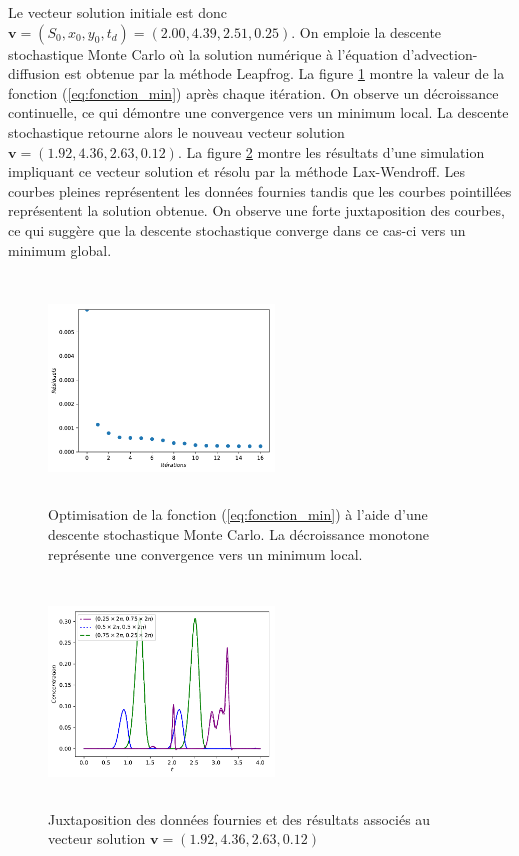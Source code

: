 \documentclass{article}
\begin{document}
Le vecteur solution initiale est donc $\textbf{v} = (S_0, x_0, y_0, t_d) = (2.00, 4.39, 2.51, 0.25)$. On emploie la descente stochastique Monte Carlo où la solution numérique à l'équation d'advection-diffusion est obtenue par la méthode Leapfrog. La figure \ref{fig:LFresiduals} montre la valeur de la fonction (\ref{eq:fonction_min}) après chaque itération. On observe un décroissance continuelle, ce qui démontre une convergence vers un minimum local. La descente stochastique retourne alors le nouveau vecteur solution $\textbf{v} = (1.92, 4.36, 2.63, 0.12)$. La figure \ref{fig:guessGraph} montre les résultats d'une simulation impliquant ce vecteur solution et résolu par la méthode Lax-Wendroff. Les courbes pleines représentent les données fournies tandis que les courbes pointillées représentent la solution obtenue. On observe une forte juxtaposition des courbes, ce qui suggère que la descente stochastique converge dans ce cas-ci vers un minimum global.

\begin{figure}[H]
	\includegraphics[width=6cm, height=6cm]{img/LFresiduels.pdf}
	\centering
	\caption{Optimisation de la fonction (\ref{eq:fonction_min}) à l'aide d'une descente stochastique Monte Carlo. La décroissance monotone représente une convergence vers un minimum local.}
	\label{fig:LFresiduals}
\end{figure}

\begin{figure}[H]
	\includegraphics[width=6cm, height=6cm]{img/GuessGraph.pdf}
	\centering
	\caption{Juxtaposition des données fournies et des résultats associés au vecteur solution $\textbf{v} = (1.92, 4.36, 2.63, 0.12)$}
	\label{fig:guessGraph}
\end{figure}
\end{document}
